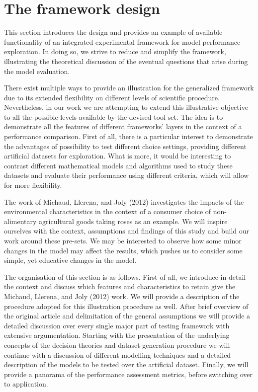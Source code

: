 \documentclass[11pt,]{article}
\title{}
\author{}
\date{}
\begin{document}
\hypertarget{the-framework-design}{%
\section{The framework design}\label{the-framework-design}}

This section introduces the design and provides an example of available
functionality of an integrated experimental framework for model
performance exploration. In doing so, we strive to reduce and simplify
the framework, illustrating the theoretical discussion of the eventual
questions that arise during the model evaluation.

There exist multiple ways to provide an illustration for the generalized
framework due to its extended flexibility on different levels of
scientific procedure. Nevertheless, in our work we are attempting to
extend this illustrative objective to all the possible levels available
by the devised tool-set. The idea is to demonstrate all the features of
different frameworks' layers in the context of a performance comparison.
First of all, there is a particular interest to demonstrate the
advantages of possibility to test different choice settings, providing
different artificial datasets for exploration. What is more, it would be
interesting to contrast different mathematical models and algorithms
used to study these datasets and evaluate their performance using
different criteria, which will allow for more flexibility.

The work of Michaud, Llerena, and Joly (2012) investigates the impacts
of the environmental characteristics in the context of a consumer choice
of non-alimentary agricultural goods taking roses as an example. We will
inspire ourselves with the context, assumptions and findings of this
study and build our work around these pre-sets. We may be interested to
observe how some minor changes in the model may affect the results,
which pushes us to consider some simple, yet educative changes in the
model.

The organisation of this section is as follows. First of all, we
introduce in detail the context and discuss which features and
characteristics to retain give the Michaud, Llerena, and Joly (2012)
work. We will provide a description of the procedure adopted for this
illustration procedure as well. After brief overview of the original
article and delimitation of the general assumptions we will provide a
detailed discussion over every single major part of testing framework
with extensive argumentation. Starting with the presentation of the
underlying concepts of the decision theories and dataset generation
procedure we will continue with a discussion of different modelling
techniques and a detailed description of the models to be tested over
the artificial dataset. Finally, we will provide a panorama of the
performance assessment metrics, before switching over to application.
\end{document}
